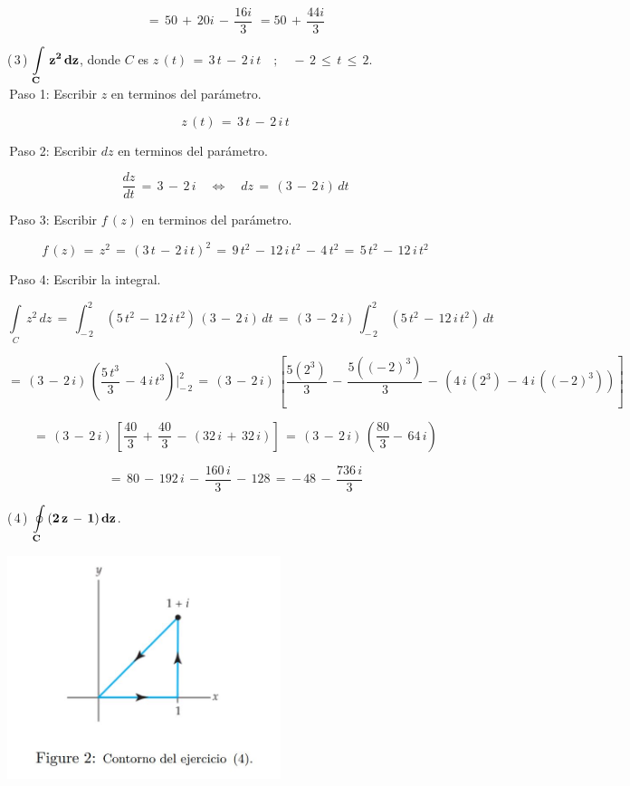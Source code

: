 \documentclass[a4paper,11pt,openany]{book}
\begin{document}
$$=\,50\,+\,20i\,-\,\dfrac{16i}{3}\,\,=\boxed{50\,+\,\dfrac{44i}{3}} $$

\textcolor{ao(english)}{(\,3\,)} $\bf{\displaystyle\int\limits_{C}\,z^{2}\,dz}$, \qquad donde \qquad $C$ es $z\,(t)\,=\,3\,t\,-\,2\,i\,t \quad;\quad -\,2\,\leq\,t\,\leq\,2$.\\

\textcolor{ao(english)}{\,Paso 1:} Escribir $z$ en terminos del parámetro.

$$z\,(t)\,=\,3\,t\,-\,2\,i\,t$$

\textcolor{ao(english)}{\,Paso 2:} Escribir $dz$ en terminos del parámetro.

$$\dfrac{dz}{dt}\,=\,3\,-\,2\,i \quad\iff\quad dz\,=\,(3\,-\,2\,i)\,dt$$

\textcolor{ao(english)}{\,Paso 3:} Escribir $f\,(z)$ en terminos del parámetro.

$$f\,(z)\,=\,z^{2}\,=\,(3\,t\,-\,2\,i\,t)^{2}\,=\,9\,t^{2}\,-\,12\,i\,t^{2}\,-\,4\,t^{2}\,=\,5\,t^{2}\,-\,12\,i\,t^{2}$$

\textcolor{ao(english)}{\,Paso 4:} Escribir la integral.

$$\displaystyle\int\limits_{C}\,z^{2}\,dz\,=\,\displaystyle\int_{-\,2}^{2}\,(5\,t^{2}\,-\,12\,i\,t^{2})\,(3\,-\,2\,i)\,dt\,=\,(3\,-\,2\,i)\,\displaystyle\int_{-\,2}^{2}\,(5\,t^{2}\,-\,12\,i\,t^{2})\,dt$$

$$=\,(3\,-\,2\,i)\,\left(\dfrac{5\,t^{3}}{3}\,-\,4\,i\,t^{3}\right)\bigg|_{-\,2}^{2}\,=\,(3\,-\,2\,i)\,\left[\dfrac{5(2^{3})}{3}\,-\,\dfrac{5((-\,2)^{3})}{3}\,-\,(4\,i\,(2^{3})\,-\,4\,i\,((-\,2)^{3}))\right]$$

$$=\,(3\,-\,2\,i)\,\left[\dfrac{40}{3}\,+\,\dfrac{40}{3}\,-\,(32\,i\,+\,32\,i)\right]\,=\,(3\,-\,2\,i)\,\left(\dfrac{80}{3}-\,64\,i\right)$$

$$=\,80\,-\,192\,i\,-\,\dfrac{160\,i}{3}\,-\,128\,=\,\boxed{-\,48\,-\,\dfrac{736\,i}{3}}$$

\textcolor{ao(english)}{(\,4\,)} $\bf{\displaystyle\oint\limits_{C}\,(2\,z\,-\,1)\,dz}$.

\begin{center}
     \includegraphics[width=8cm]{figura-2.JPG}
\end{center}
\end{document}
